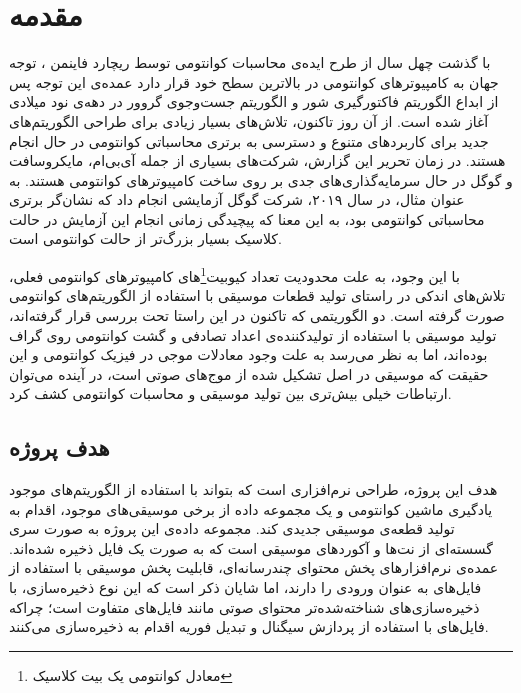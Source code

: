 \chapter{مقدمه}


با گذشت چهل سال از طرح ایده‌ی محاسبات کوانتومی توسط ریچارد فاینمن
\cite{feynman}،
توجه جهان به کامپیوترهای کوانتومی در بالاترین سطح خود قرار دارد
عمده‌ی این توجه پس از ابداع الگوریتم فاکتورگیری شور
و الگوریتم جست‌وجوی گروور
در دهه‌ی نود میلادی آغاز شده است. از آن روز تاکنون، تلاش‌های بسیار زیادی برای طراحی الگوریتم‌های جدید برای کاربردهای متنوع و دسترسی به برتری محاسباتی کوانتومی در حال انجام هستند. در زمان تحریر این گزارش، شرکت‌های بسیاری از جمله آی‌بی‌ام، مایکروسافت و گوگل در حال سرمایه‌گذاری‌های جدی بر روی ساخت کامپیوترهای کوانتومی هستند. به عنوان مثال، در سال ۲۰۱۹،
شرکت گوگل آزمایشی 
\cite{google_supremacy}
انجام داد که نشان‌گر برتری محاسباتی کوانتومی بود، به این معنا که پیچیدگی زمانی انجام این آزمایش در حالت کلاسیک بسیار بزرگ‌تر از حالت کوانتومی است.

با این وجود، به علت محدودیت تعداد کیوبیت\footnote{معادل کوانتومی یک بیت کلاسیک}های کامپیوترهای کوانتومی فعلی، تلاش‌های اندکی در راستای تولید قطعات موسیقی با استفاده از الگوریتم‌های کوانتومی صورت گرفته است. دو الگوریتمی که تاکنون در این راستا تحت بررسی قرار گرفته‌اند، تولید موسیقی با استفاده از تولیدکننده‌ی اعداد تصادفی
و گشت کوانتومی روی گراف \cite{miranda}
بوده‌اند، اما به نظر می‌رسد به علت وجود معادلات موجی در فیزیک کوانتومی و این حقیقت که موسیقی در اصل تشکیل شده از موج‌های صوتی است، در آینده می‌توان ارتباطات خیلی بیش‌تری بین تولید موسیقی و محاسبات کوانتومی کشف کرد.

\section{هدف پروژه}
هدف این پروژه، طراحی نرم‌افزاری است که بتواند با استفاده از الگوریتم‌های موجود یادگیری ماشین کوانتومی و یک  مجموعه داده از برخی موسیقی‌های موجود، اقدام به تولید قطعه‌ی موسیقی
جدیدی کند.
مجموعه داده‌ی این پروژه به صورت سری گسسته‌ای از نت‌ها و آکوردهای موسیقی است که به صورت یک فایل 
ذخیره شده‌اند.
عمده‌ی نرم‌افزارهای پخش محتوای چندرسانه‌ای، قابلیت پخش موسیقی با استفاده از فایل‌های 
به عنوان ورودی را دارند، اما
 شایان ذکر است که این نوع ذخیره‌سازی، با ذخیره‌سازی‌های شناخته‌شده‌تر محتوای صوتی مانند فایل‌های 
 متفاوت است؛ چراکه فایل‌های
 با استفاده از پردازش سیگنال و تبدیل فوریه اقدام به ذخیره‌سازی می‌کنند.
 
